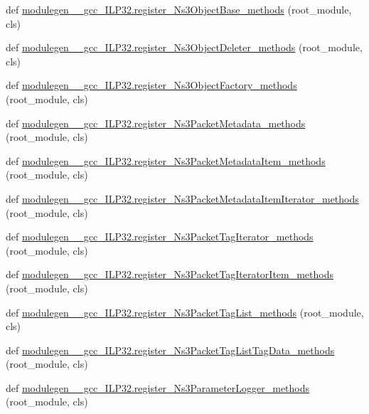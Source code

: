 \begin{DoxyCompactItemize}
\item 
def \hyperlink{namespacemodulegen____gcc__ILP32_ae2b1090e9e01cb32c1979aebbbf2d3d0}{modulegen\+\_\+\+\_\+gcc\+\_\+\+I\+L\+P32.\+register\+\_\+\+Ns3\+Object\+Base\+\_\+methods} (root\+\_\+module, cls)
\item 
def \hyperlink{namespacemodulegen____gcc__ILP32_ae7b70d95135f82e9f3f5abb42654e3de}{modulegen\+\_\+\+\_\+gcc\+\_\+\+I\+L\+P32.\+register\+\_\+\+Ns3\+Object\+Deleter\+\_\+methods} (root\+\_\+module, cls)
\item 
def \hyperlink{namespacemodulegen____gcc__ILP32_a3c95ec67fc1514c6b5c58314ef81e38e}{modulegen\+\_\+\+\_\+gcc\+\_\+\+I\+L\+P32.\+register\+\_\+\+Ns3\+Object\+Factory\+\_\+methods} (root\+\_\+module, cls)
\item 
def \hyperlink{namespacemodulegen____gcc__ILP32_a219b8e3d7145a4b09888203032e16df7}{modulegen\+\_\+\+\_\+gcc\+\_\+\+I\+L\+P32.\+register\+\_\+\+Ns3\+Packet\+Metadata\+\_\+methods} (root\+\_\+module, cls)
\item 
def \hyperlink{namespacemodulegen____gcc__ILP32_aa4a4a003c4a8b7886a31cb3d1b2f9062}{modulegen\+\_\+\+\_\+gcc\+\_\+\+I\+L\+P32.\+register\+\_\+\+Ns3\+Packet\+Metadata\+Item\+\_\+methods} (root\+\_\+module, cls)
\item 
def \hyperlink{namespacemodulegen____gcc__ILP32_af0c41f86c2c7e2875da9fd12e03ec3df}{modulegen\+\_\+\+\_\+gcc\+\_\+\+I\+L\+P32.\+register\+\_\+\+Ns3\+Packet\+Metadata\+Item\+Iterator\+\_\+methods} (root\+\_\+module, cls)
\item 
def \hyperlink{namespacemodulegen____gcc__ILP32_a9af269241fe2e52d9713c6fef73ade54}{modulegen\+\_\+\+\_\+gcc\+\_\+\+I\+L\+P32.\+register\+\_\+\+Ns3\+Packet\+Tag\+Iterator\+\_\+methods} (root\+\_\+module, cls)
\item 
def \hyperlink{namespacemodulegen____gcc__ILP32_a81cdb0716a2447fa9ebf30a8a43132d5}{modulegen\+\_\+\+\_\+gcc\+\_\+\+I\+L\+P32.\+register\+\_\+\+Ns3\+Packet\+Tag\+Iterator\+Item\+\_\+methods} (root\+\_\+module, cls)
\item 
def \hyperlink{namespacemodulegen____gcc__ILP32_a7f10f5444037901328380d4d5c08291a}{modulegen\+\_\+\+\_\+gcc\+\_\+\+I\+L\+P32.\+register\+\_\+\+Ns3\+Packet\+Tag\+List\+\_\+methods} (root\+\_\+module, cls)
\item 
def \hyperlink{namespacemodulegen____gcc__ILP32_aa623e91ff45aa8dce22ab35f70e26187}{modulegen\+\_\+\+\_\+gcc\+\_\+\+I\+L\+P32.\+register\+\_\+\+Ns3\+Packet\+Tag\+List\+Tag\+Data\+\_\+methods} (root\+\_\+module, cls)
\item 
def \hyperlink{namespacemodulegen____gcc__ILP32_ab77ddfb4a23eddcfd515d3ff8104d96a}{modulegen\+\_\+\+\_\+gcc\+\_\+\+I\+L\+P32.\+register\+\_\+\+Ns3\+Parameter\+Logger\+\_\+methods} (root\+\_\+module, cls)

\end{DoxyCompactItemize}
